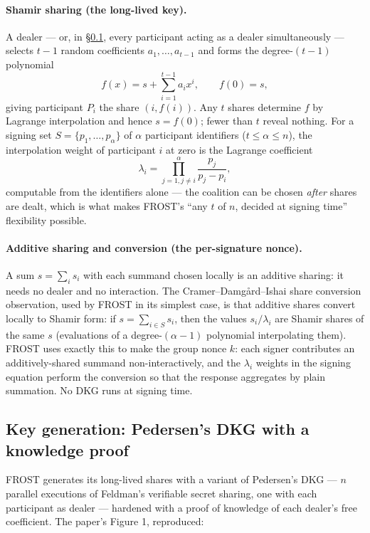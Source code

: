 \documentclass[11pt,a4paper]{article}
\theoremstyle{definition}
\begin{document}
\paragraph{Shamir sharing (the long-lived key).} A dealer --- or, in
\S\ref{sec:fr-keygen}, every participant acting as a dealer simultaneously
--- selects $t-1$ random coefficients $a_1, \dots, a_{t-1}$ and forms the
degree-$(t-1)$ polynomial
\[
f(x) = s + \sum_{i=1}^{t-1} a_i x^i, \qquad f(0) = s,
\]
giving participant $P_i$ the share $(i, f(i))$. Any $t$ shares determine
$f$ by Lagrange interpolation and hence $s = f(0)$; fewer than $t$ reveal
nothing. For a signing set $S = \{p_1, \dots, p_\alpha\}$ of $\alpha$
participant identifiers ($t \le \alpha \le n$), the interpolation weight of
participant $i$ at zero is the Lagrange coefficient
\[
\lambda_i = \prod_{j=1, j \ne i}^{\alpha} \frac{p_j}{p_j - p_i},
\]
computable from the identifiers alone --- the coalition can be chosen
\emph{after} shares are dealt, which is what makes FROST's ``any $t$ of
$n$, decided at signing time'' flexibility possible.

\paragraph{Additive sharing and conversion (the per-signature nonce).} A
sum $s = \sum_{i} s_i$ with each summand chosen locally is an additive
sharing: it needs no dealer and no interaction. The
Cramer--Damg{\aa}rd--Ishai share conversion observation, used by FROST in
its simplest case, is that additive shares convert locally to Shamir form:
if $s = \sum_{i \in S} s_i$, then the values $s_i / \lambda_i$ are Shamir
shares of the same $s$ (evaluations of a degree-$(\alpha-1)$ polynomial
interpolating them). FROST uses exactly this to make the group nonce $k$:
each signer contributes an additively-shared summand non-interactively,
and the $\lambda_i$ weights in the signing equation perform the conversion
so that the response aggregates by plain summation. No DKG runs at signing
time.

\subsection{Key generation: Pedersen's DKG with a knowledge proof}
\label{sec:fr-keygen}

FROST generates its long-lived shares with a variant of Pedersen's DKG ---
$n$ parallel executions of Feldman's verifiable secret sharing, one with
each participant as dealer --- hardened with a proof of knowledge of each
dealer's free coefficient. The paper's Figure 1, reproduced:
\end{document}
